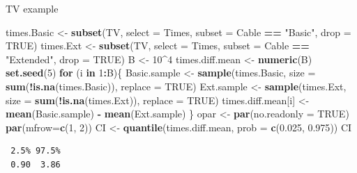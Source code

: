 \documentclass[
  ignorenonframetext,
]{beamer}
\newenvironment{Shaded}{\begin{snugshade}}{\end{snugshade}}
\newcommand{\AttributeTok}[1]{\textcolor[rgb]{0.13,0.29,0.53}{#1}}
\newcommand{\ConstantTok}[1]{\textcolor[rgb]{0.56,0.35,0.01}{#1}}
\newcommand{\ControlFlowTok}[1]{\textcolor[rgb]{0.13,0.29,0.53}{\textbf{#1}}}
\newcommand{\DecValTok}[1]{\textcolor[rgb]{0.00,0.00,0.81}{#1}}
\newcommand{\FloatTok}[1]{\textcolor[rgb]{0.00,0.00,0.81}{#1}}
\newcommand{\FunctionTok}[1]{\textcolor[rgb]{0.13,0.29,0.53}{\textbf{#1}}}
\newcommand{\NormalTok}[1]{#1}
\newcommand{\OtherTok}[1]{\textcolor[rgb]{0.56,0.35,0.01}{#1}}
\newcommand{\SpecialCharTok}[1]{\textcolor[rgb]{0.81,0.36,0.00}{\textbf{#1}}}
\newcommand{\StringTok}[1]{\textcolor[rgb]{0.31,0.60,0.02}{#1}}
\begin{document}
\begin{frame}[fragile]{TV example}
\protect\hypertarget{tv-example-3}{}
\tiny

\begin{Shaded}
\begin{Highlighting}[]
\NormalTok{times.Basic }\OtherTok{\textless{}{-}} \FunctionTok{subset}\NormalTok{(TV, }\AttributeTok{select =}\NormalTok{ Times, }
                      \AttributeTok{subset =}\NormalTok{ Cable }\SpecialCharTok{==} \StringTok{"Basic"}\NormalTok{, }\AttributeTok{drop =} \ConstantTok{TRUE}\NormalTok{)}
\NormalTok{times.Ext }\OtherTok{\textless{}{-}} \FunctionTok{subset}\NormalTok{(TV, }\AttributeTok{select =}\NormalTok{ Times, }
                    \AttributeTok{subset =}\NormalTok{ Cable }\SpecialCharTok{==} \StringTok{"Extended"}\NormalTok{, }\AttributeTok{drop =} \ConstantTok{TRUE}\NormalTok{)}
\NormalTok{B }\OtherTok{\textless{}{-}} \DecValTok{10}\SpecialCharTok{\^{}}\DecValTok{4}
\NormalTok{times.diff.mean }\OtherTok{\textless{}{-}} \FunctionTok{numeric}\NormalTok{(B)}
\FunctionTok{set.seed}\NormalTok{(}\DecValTok{5}\NormalTok{)}
\ControlFlowTok{for}\NormalTok{ (i }\ControlFlowTok{in} \DecValTok{1}\SpecialCharTok{:}\NormalTok{B)\{}
\NormalTok{  Basic.sample }\OtherTok{\textless{}{-}} \FunctionTok{sample}\NormalTok{(times.Basic, }
                  \AttributeTok{size =} \FunctionTok{sum}\NormalTok{(}\SpecialCharTok{!}\FunctionTok{is.na}\NormalTok{(times.Basic)), }\AttributeTok{replace =} \ConstantTok{TRUE}\NormalTok{)}
\NormalTok{  Ext.sample }\OtherTok{\textless{}{-}} \FunctionTok{sample}\NormalTok{(times.Ext,}
                  \AttributeTok{size =} \FunctionTok{sum}\NormalTok{(}\SpecialCharTok{!}\FunctionTok{is.na}\NormalTok{(times.Ext)), }\AttributeTok{replace =} \ConstantTok{TRUE}\NormalTok{)}
\NormalTok{  times.diff.mean[i] }\OtherTok{\textless{}{-}} \FunctionTok{mean}\NormalTok{(Basic.sample) }\SpecialCharTok{{-}} \FunctionTok{mean}\NormalTok{(Ext.sample)}
\NormalTok{\}}
\NormalTok{opar }\OtherTok{\textless{}{-}} \FunctionTok{par}\NormalTok{(}\AttributeTok{no.readonly =} \ConstantTok{TRUE}\NormalTok{)}
\FunctionTok{par}\NormalTok{(}\AttributeTok{mfrow=}\FunctionTok{c}\NormalTok{(}\DecValTok{1}\NormalTok{, }\DecValTok{2}\NormalTok{))}
\NormalTok{CI }\OtherTok{\textless{}{-}} \FunctionTok{quantile}\NormalTok{(times.diff.mean, }\AttributeTok{prob =} \FunctionTok{c}\NormalTok{(}\FloatTok{0.025}\NormalTok{, }\FloatTok{0.975}\NormalTok{))}
\NormalTok{CI}
\end{Highlighting}
\end{Shaded}

\begin{verbatim}
 2.5% 97.5% 
 0.90  3.86 
\end{verbatim}

\normalsize
\end{frame}
\end{document}
